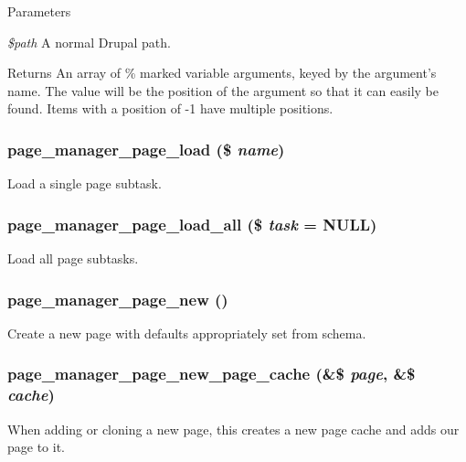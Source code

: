 \begin{DoxyParams}{Parameters}
\item[{\em \$path}]A normal Drupal path.\end{DoxyParams}
\begin{DoxyReturn}{Returns}
An array of \% marked variable arguments, keyed by the argument's name. The value will be the position of the argument so that it can easily be found. Items with a position of -\/1 have multiple positions. 
\end{DoxyReturn}
\hypertarget{page_8inc_aa18e88f2c523d008c125fef1de5f8ae6}{
\subsubsection[{page\_\-manager\_\-page\_\-load}]{\setlength{\rightskip}{0pt plus 5cm}page\_\-manager\_\-page\_\-load (\$ {\em name})}}
\label{page_8inc_aa18e88f2c523d008c125fef1de5f8ae6}
Load a single page subtask. \hypertarget{page_8inc_a972b54bd49c7bff37077b15f7e38e0fa}{
\subsubsection[{page\_\-manager\_\-page\_\-load\_\-all}]{\setlength{\rightskip}{0pt plus 5cm}page\_\-manager\_\-page\_\-load\_\-all (\$ {\em task} = {\ttfamily NULL})}}
\label{page_8inc_a972b54bd49c7bff37077b15f7e38e0fa}
Load all page subtasks. \hypertarget{page_8inc_a4ac24df17e8abb4b1abf5b7f8363711a}{
\subsubsection[{page\_\-manager\_\-page\_\-new}]{\setlength{\rightskip}{0pt plus 5cm}page\_\-manager\_\-page\_\-new ()}}
\label{page_8inc_a4ac24df17e8abb4b1abf5b7f8363711a}
Create a new page with defaults appropriately set from schema. \hypertarget{page_8inc_a0e1ae5b02b5976676123d40fa3a3dabd}{
\subsubsection[{page\_\-manager\_\-page\_\-new\_\-page\_\-cache}]{\setlength{\rightskip}{0pt plus 5cm}page\_\-manager\_\-page\_\-new\_\-page\_\-cache (\&\$ {\em page}, \/  \&\$ {\em cache})}}
\label{page_8inc_a0e1ae5b02b5976676123d40fa3a3dabd}
When adding or cloning a new page, this creates a new page cache and adds our page to it.

